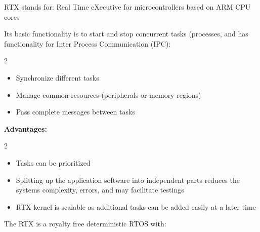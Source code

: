 \documentclass[a4paper,11pt]{article}
\begin{document}
RTX stands for: Real Time eXecutive for microcontrollers based on ARM CPU cores\par



Its basic functionality is to start and stop concurrent tasks (processes, and has functionality for Inter Process Communication (IPC):\par

\Needspace{52pt}
\begin{multicols}{2}
\begin{itemize}
\item \begin{minipage}[t]{\linewidth}Synchronize different tasks\end{minipage}
\item \begin{minipage}[t]{\linewidth}Manage common resources (peripherals or memory regions)\end{minipage}
\item \begin{minipage}[t]{\linewidth}Pass complete messages between tasks\end{minipage}
\end{itemize}
\end{multicols}



\textbf{Advantages:}\par

\Needspace{64pt}
\begin{multicols}{2}
\begin{itemize}
\item \begin{minipage}[t]{\linewidth}Tasks can be prioritized\end{minipage}
\item \begin{minipage}[t]{\linewidth}Splitting up the application software into independent parts reduces the systems complexity, errors, and may facilitate testings\end{minipage}
\item \begin{minipage}[t]{\linewidth}RTX kernel is scalable as additional tasks can be added easily at a later time\end{minipage}
\end{itemize}
\end{multicols}



The RTX is a royalty free deterministic RTOS with:\par
\end{document}
